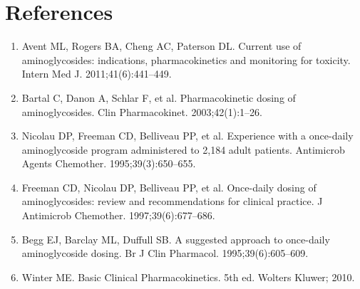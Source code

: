 \section*{References}
\begin{enumerate}
  \item Avent ML, Rogers BA, Cheng AC, Paterson DL. Current use of aminoglycosides: indications, pharmacokinetics and monitoring for toxicity. Intern Med J. 2011;41(6):441--449.
  \item Bartal C, Danon A, Schlar F, et al. Pharmacokinetic dosing of aminoglycosides. Clin Pharmacokinet. 2003;42(1):1--26.
  \item Nicolau DP, Freeman CD, Belliveau PP, et al. Experience with a once-daily aminoglycoside program administered to 2,184 adult patients. Antimicrob Agents Chemother. 1995;39(3):650--655.
  \item Freeman CD, Nicolau DP, Belliveau PP, et al. Once-daily dosing of aminoglycosides: review and recommendations for clinical practice. J Antimicrob Chemother. 1997;39(6):677--686.
  \item Begg EJ, Barclay ML, Duffull SB. A suggested approach to once-daily aminoglycoside dosing. Br J Clin Pharmacol. 1995;39(6):605--609.
  \item Winter ME. Basic Clinical Pharmacokinetics. 5th ed. Wolters Kluwer; 2010.
\end{enumerate}

\clearpage

